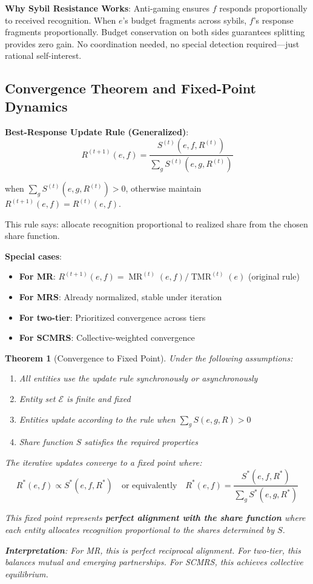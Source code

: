\documentclass[11pt,a4paper]{article}
\newtheorem{theorem}{Theorem}[section]
\theoremstyle{definition}
\theoremstyle{remark}
\newcommand{\E}{\mathcal{E}}
\DeclareMathOperator{\TMR}{TMR}
\DeclareMathOperator{\MR}{MR}
\begin{document}
\textbf{Why Sybil Resistance Works}: Anti-gaming ensures $f$ responds proportionally to received recognition. When $e$'s budget fragments across sybils, $f$'s response fragments proportionally. Budget conservation on both sides guarantees splitting provides zero gain. No coordination needed, no special detection required---just rational self-interest.

\subsection{Convergence Theorem and Fixed-Point Dynamics}

\textbf{Best-Response Update Rule (Generalized)}:
\[ R^{(t+1)}(e,f) = \frac{S^{(t)}(e,f,R^{(t)})}{\sum_g S^{(t)}(e,g,R^{(t)})} \]

when $\sum_g S^{(t)}(e,g,R^{(t)}) > 0$, otherwise maintain $R^{(t+1)}(e,f) = R^{(t)}(e,f)$.

This rule says: allocate recognition proportional to realized share from the chosen share function.

\textbf{Special cases}:
\begin{itemize}
\item \textbf{For MR}: $R^{(t+1)}(e,f) = \MR^{(t)}(e,f) / \TMR^{(t)}(e)$ (original rule)
\item \textbf{For MRS}: Already normalized, stable under iteration
\item \textbf{For two-tier}: Prioritized convergence across tiers
\item \textbf{For SCMRS}: Collective-weighted convergence
\end{itemize}

\begin{theorem}[Convergence to Fixed Point]
Under the following assumptions:
\begin{enumerate}
\item All entities use the update rule synchronously or asynchronously
\item Entity set $\E$ is finite and fixed
\item Entities update according to the rule when $\sum_g S(e,g,R) > 0$
\item Share function $S$ satisfies the required properties
\end{enumerate}

The iterative updates converge to a fixed point where:
\[ R^*(e,f) \propto S^*(e,f,R^*) \quad \text{or equivalently} \quad R^*(e,f) = \frac{S^*(e,f,R^*)}{\sum_g S^*(e,g,R^*)} \]

This fixed point represents \textbf{perfect alignment with the share function} where each entity allocates recognition proportional to the shares determined by $S$.

\textbf{Interpretation}: For MR, this is perfect reciprocal alignment. For two-tier, this balances mutual and emerging partnerships. For SCMRS, this achieves collective equilibrium.
\end{theorem}
\end{document}

